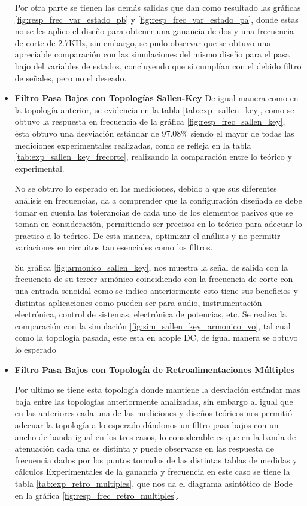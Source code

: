 \begin{itemize}
                Por otra parte se tienen las demás salidas que dan como resultado las gráficas \ref{fig:resp_frec_var_estado_pb} y \ref{fig:resp_frec_var_estado_pa}, donde estas no se les aplico el diseño para obtener una ganancia de dos y una frecuencia de corte de 2.7KHz, sin embargo, se pudo observar que se obtuvo una apreciable comparación con las simulaciones del mismo diseño para el pasa bajo del variables de estados, concluyendo que si cumplían con el debido filtro de señales, pero no el deseado.

            \item \textbf{Filtro Pasa Bajos con Topologías Sallen-Key}
                De igual manera como en la topología anterior, se evidencia en la tabla \ref{tab:exp_sallen_key}, como se obtuvo la respuesta en frecuencia de la gráfica \ref{fig:resp_frec_sallen_key}, ésta obtuvo una desviación estándar de 97.08\%  siendo el mayor de todas las mediciones experimentales realizadas, como se refleja en la tabla \ref{tab:exp_sallen_key_frecorte}, realizando la comparación entre lo teórico y experimental. 

                No se obtuvo lo esperado en las mediciones, debido  a que sus diferentes análisis en frecuencias, da a comprender que la configuración diseñada se debe tomar en cuenta las tolerancias de cada uno de los elementos pasivos que se toman en consideración, permitiendo ser precisos en lo teórico para adecuar lo practico a lo teórico. De esta manera, optimizar el análisis y no permitir variaciones en circuitos tan esenciales como los filtros.

                Su gráfica \ref{fig:armonico_sallen_key}, nos muestra la señal de salida con la frecuencia de su tercer armónico coincidiendo con la frecuencia de corte con una entrada senoidal como se indico anteriormente esto tiene sus beneficios y distintas aplicaciones como pueden ser para audio, instrumentación electrónica, control de sistemas, electrónica de potencias, etc. Se realiza la comparación con la simulación \ref{fig:sim_sallen_key_armonico_vo}, tal cual como la topología pasada, este esta en acople DC, de igual manera se obtuvo lo esperado

            \item \textbf{Filtro Pasa Bajos con Topología de Retroalimentaciones Múltiples}

                Por ultimo se tiene esta topología donde mantiene la desviación estándar mas baja entre las topologías anteriormente analizadas, sin embargo al igual que en las anteriores cada una de las mediciones y diseños teóricos nos permitió adecuar la topología a lo esperado dándonos un filtro pasa bajos con un ancho de banda igual en los tres casos, lo considerable es que en la banda de atenuación cada una es distinta y puede observarse en las respuesta de frecuencia dados por los puntos tomados de las distintas tablas de medidas y cálculos Experimentales de la ganancia y frecuencia en este caso se tiene la tabla \ref{tab:exp_retro_multiples}, que nos da el diagrama asintótico de Bode en la gráfica \ref{fig:resp_frec_retro_multiples}.


\end{itemize}

